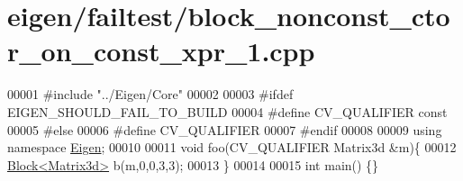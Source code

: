 \hypertarget{eigen_2failtest_2block__nonconst__ctor__on__const__xpr__1_8cpp_source}{}\section{eigen/failtest/block\+\_\+nonconst\+\_\+ctor\+\_\+on\+\_\+const\+\_\+xpr\+\_\+1.cpp}
\label{eigen_2failtest_2block__nonconst__ctor__on__const__xpr__1_8cpp_source}

\begin{DoxyCode}
00001 \textcolor{preprocessor}{#include "../Eigen/Core"}
00002 
00003 \textcolor{preprocessor}{#ifdef EIGEN\_SHOULD\_FAIL\_TO\_BUILD}
00004 \textcolor{preprocessor}{#define CV\_QUALIFIER const}
00005 \textcolor{preprocessor}{#else}
00006 \textcolor{preprocessor}{#define CV\_QUALIFIER}
00007 \textcolor{preprocessor}{#endif}
00008 
00009 \textcolor{keyword}{using namespace }\hyperlink{namespace_eigen}{Eigen};
00010 
00011 \textcolor{keywordtype}{void} foo(CV\_QUALIFIER Matrix3d &m)\{
00012     \hyperlink{group___core___module_class_eigen_1_1_block}{Block<Matrix3d>} b(m,0,0,3,3);
00013 \}
00014 
00015 \textcolor{keywordtype}{int} main() \{\}
\end{DoxyCode}
